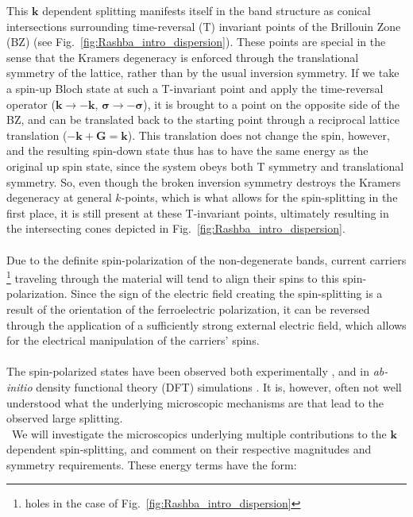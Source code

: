 This $\bm k$ dependent splitting manifests itself in the band structure as conical intersections surrounding time-reversal (T) invariant points of the Brillouin Zone (BZ) (see Fig.~\ref{fig:Rashba_intro_dispersion}).
These points are special in the sense that the Kramers degeneracy \cite{Kramerstheorem} is enforced through the translational symmetry of the lattice, rather than by the usual inversion symmetry.
If we take a spin-up Bloch state at such a T-invariant point and apply the time-reversal operator ($\bm k \rightarrow \bm {-k}$, $\bm{\sigma} \rightarrow -\bm{\sigma}$), it is brought to a point on the opposite side of the BZ, and can be translated back to the starting point through a reciprocal lattice translation ($-\bm k + \bm G = \bm k$). This translation does not change the spin, however, and the resulting spin-down state thus has to have the same energy as the original up spin state, since the system obeys both T symmetry and translational symmetry.
So, even though the broken inversion symmetry destroys the Kramers degeneracy at general $k$-points, which is what allows for the spin-splitting in the first place, it is still present at these T-invariant points, ultimately resulting in the intersecting cones depicted in Fig.~\ref{fig:Rashba_intro_dispersion}.
\\\\
Due to the definite spin-polarization of the non-degenerate bands, current carriers \footnote{holes in the case of Fig.~\ref{fig:Rashba_intro_dispersion}} traveling through the material will tend to align their spins to this spin-polarization.
Since the sign of the electric field creating the spin-splitting is a result of the orientation of the ferroelectric polarization, it can be reversed through the application of a sufficiently strong external electric field, which allows for the electrical manipulation of the carriers' spins.
\\\\
The spin-polarized states have been observed both experimentally \cite{Ishizaka2011,Liebmann2016,Krempasky2015}, and in {\it ab-initio} density functional theory (DFT) simulations \cite{DiSante2013, Kim2014, Picozzi2014}.
It is, however, often not well understood what the underlying microscopic mechanisms are that lead to the observed large splitting.
\\\
We will investigate the microscopics underlying multiple contributions to the $\bm{k}$ dependent spin-splitting, and comment on their respective magnitudes and symmetry requirements. 
These energy terms have the form:
